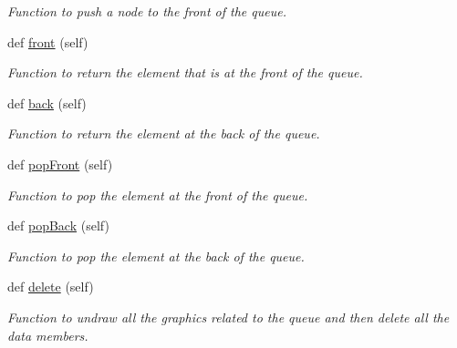 \begin{DoxyCompactItemize}
\begin{DoxyCompactList}\small\item\em Function to push a node to the front of the queue. \end{DoxyCompactList}\item 
def \hyperlink{class_queue_1_1_queue_a7d3ec12e83314c6a109e8403b9250c30}{front} (self)
\begin{DoxyCompactList}\small\item\em Function to return the element that is at the front of the queue. \end{DoxyCompactList}\item 
def \hyperlink{class_queue_1_1_queue_ab49a295f4ebc449e5830119085493614}{back} (self)
\begin{DoxyCompactList}\small\item\em Function to return the element at the back of the queue. \end{DoxyCompactList}\item 
def \hyperlink{class_queue_1_1_queue_aa2cd3a51ee6600ca226f7c43623d6ede}{pop\+Front} (self)
\begin{DoxyCompactList}\small\item\em Function to pop the element at the front of the queue. \end{DoxyCompactList}\item 
def \hyperlink{class_queue_1_1_queue_a192c71ff5839f8b1970976eefaaec777}{pop\+Back} (self)
\begin{DoxyCompactList}\small\item\em Function to pop the element at the back of the queue. \end{DoxyCompactList}\item 
def \hyperlink{class_queue_1_1_queue_ac384b9efaf5e8d9b1b7a34183062468c}{delete} (self)
\begin{DoxyCompactList}\small\item\em Function to undraw all the graphics related to the queue and then delete all the data members. \end{DoxyCompactList}\end{DoxyCompactItemize}
